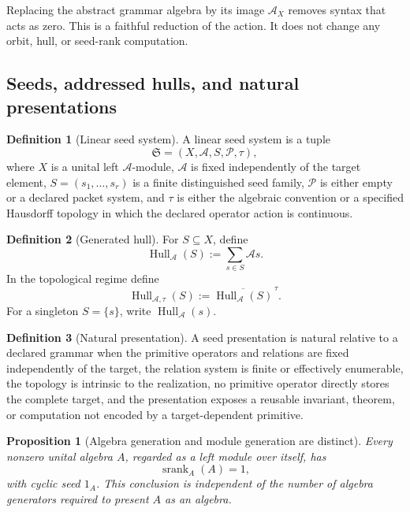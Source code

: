 \documentclass[11pt]{article}
\newtheorem{proposition}[proposition]{Proposition}
\theoremstyle{definition}
\newtheorem{definition}[definition]{Definition}
\theoremstyle{remark}
\theoremstyle{definition}\newtheorem{example}[theorem]{Example}
\newcommand{\A}{\mathcal A}
\newcommand{\Pcal}{\mathcal P}
\newcommand{\Hull}{\operatorname{Hull}}
\newcommand{\srank}{\operatorname{srank}}
\newcommand{\cl}[1]{\overline{#1}}
\newcommand{\RecordID}[1]{\label{record:#1}}
\newcommand{\Depends}[1]{}
\begin{document}
\begin{keyidea}
Replacing the abstract grammar algebra by its image \(\A_X\) removes syntax that acts as zero.  This is a faithful reduction of the action.  It does not change any orbit, hull, or seed-rank computation.
\end{keyidea}


\subsection{Seeds, addressed hulls, and natural presentations}
\begin{definition}[Linear seed system]
\label{def:seed-system}
A linear seed system is a tuple
\[
\mathfrak S=(X,\A,S,\Pcal,\tau),
\]
where $X$ is a unital left $\A$-module, $\A$ is fixed independently of the target element, $S=(s_1,\ldots,s_r)$ is a finite distinguished seed family, $\Pcal$ is either empty or a declared packet system, and $\tau$ is either the algebraic convention or a specified Hausdorff topology in which the declared operator action is continuous.
\end{definition}
\RecordID{PSC-I-D-SEED-SYSTEM}

\begin{definition}[Generated hull]
\label{def:generated-hull}
For $S\subseteq X$, define
\[
\Hull_{\A}(S):=\sum_{s\in S}\A s.
\]
In the topological regime define
\[
\Hull_{\A,\tau}(S):=\cl{\Hull_{\A}(S)}^{\,\tau}.
\]
For a singleton $S=\{s\}$, write $\Hull_{\A}(s)$.
\end{definition}
\RecordID{PSC-I-D-GENERATED-HULL}

\begin{definition}[Natural presentation]
\label{def:natural-presentation}
A seed presentation is natural relative to a declared grammar when the primitive operators and relations are fixed independently of the target, the relation system is finite or effectively enumerable, the topology is intrinsic to the realization, no primitive operator directly stores the complete target, and the presentation exposes a reusable invariant, theorem, or computation not encoded by a target-dependent primitive.
\end{definition}
\RecordID{PSC-I-D-NATURAL-PRESENTATION}

\begin{proposition}[Algebra generation and module generation are distinct]
\label{prop:algebra-module-generation}
Every nonzero unital algebra $A$, regarded as a left module over itself, has
\[
\srank_A(A)=1,
\]
with cyclic seed $1_A$.  This conclusion is independent of the number of algebra generators required to present $A$ as an algebra.
\end{proposition}
\RecordID{PSC-I-P-ALGEBRA-MODULE-GENERATION}
\Depends{PSC-I-D-GENERATED-HULL.}
\end{document}
